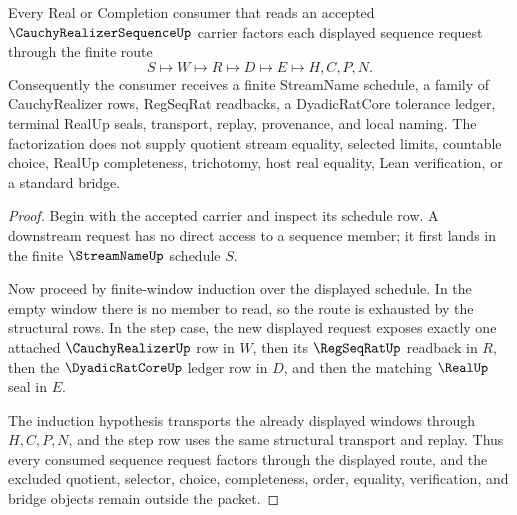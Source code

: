 \begin{theorem}
\label{thm:cauchy-realizer-sequence-window-factorization}
Every Real or Completion consumer that reads an accepted $\CauchyRealizerSequenceUp$ carrier factors each displayed sequence request through the finite route
$$
S \longmapsto W \longmapsto R \longmapsto D \longmapsto E \longmapsto H,C,P,N .
$$
Consequently the consumer receives a finite StreamName schedule, a family of CauchyRealizer rows, RegSeqRat readbacks, a DyadicRatCore tolerance ledger, terminal RealUp seals, transport, replay, provenance, and local naming. The factorization does not supply quotient stream equality, selected limits, countable choice, RealUp completeness, trichotomy, host real equality, Lean verification, or a standard bridge.
\end{theorem}
\begin{proof}
Begin with the accepted carrier and inspect its schedule row. A downstream request has no direct access to a sequence member; it first lands in the finite $\StreamNameUp$ schedule $S$.

Now proceed by finite-window induction over the displayed schedule. In the empty window there is no member to read, so the route is exhausted by the structural rows. In the step case, the new displayed request exposes exactly one attached $\CauchyRealizerUp$ row in $W$, then its $\RegSeqRatUp$ readback in $R$, then the $\DyadicRatCoreUp$ ledger row in $D$, and then the matching $\RealUp$ seal in $E$.

The induction hypothesis transports the already displayed windows through $H,C,P,N$, and the step row uses the same structural transport and replay. Thus every consumed sequence request factors through the displayed route, and the excluded quotient, selector, choice, completeness, order, equality, verification, and bridge objects remain outside the packet.
\end{proof}

